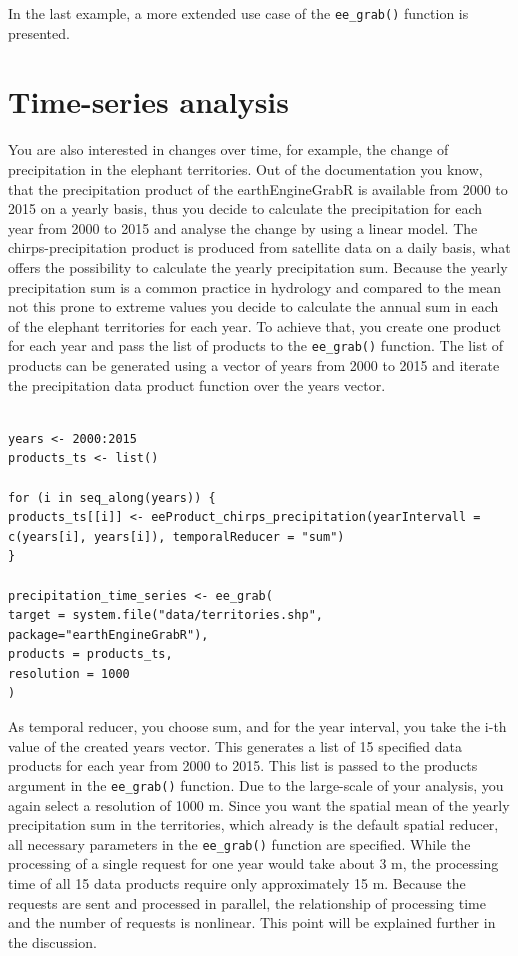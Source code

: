 In the last example, a more extended use case of the \texttt{ee\_grab()} function is presented.

\section{Time-series analysis}

You are also interested in changes over time, for example, the change of precipitation in the elephant territories. Out of the documentation you know, that the precipitation product of the earthEngineGrabR is available from 2000 to 2015 on a yearly basis, thus you decide to calculate the precipitation for each year from 2000 to 2015 and analyse the change by using a linear model. The chirps-precipitation product is produced from satellite data on a daily basis, what offers the possibility to calculate the yearly precipitation sum. Because the yearly precipitation sum is a common practice in hydrology and compared to the mean not this prone to extreme values you decide to calculate the annual sum in each of the elephant territories for each year. To achieve that, you create one product for each year and pass the list of products to the \texttt{ee\_grab()} function.
The list of products can be generated using a vector of years from 2000 to 2015 and iterate the precipitation data product function over the years vector.

\begin{lstlisting}

years <- 2000:2015
products_ts <- list()

for (i in seq_along(years)) {
products_ts[[i]] <- eeProduct_chirps_precipitation(yearIntervall = c(years[i], years[i]), temporalReducer = "sum")
}

precipitation_time_series <- ee_grab(
target = system.file("data/territories.shp", package="earthEngineGrabR"),
products = products_ts,
resolution = 1000
)
\end{lstlisting}


As temporal reducer, you choose sum, and for the year interval, you take the i-th value of the created years vector. This generates a list of 15 specified data products for each year from 2000 to 2015. This list is passed to the products argument in the \texttt{ee\_grab()} function.
Due to the large-scale of your analysis, you again select a resolution of 1000 m. Since you want the spatial mean of the yearly precipitation sum in the territories, which already is the default spatial reducer, all necessary parameters in the \texttt{ee\_grab()} function are specified. While the processing of a single request for one year would take about 3 m, the processing time of all 15 data products require only approximately 15 m. Because the requests are sent and processed in parallel, the relationship of processing time and the number of requests is nonlinear. This point will be explained further in the discussion.

